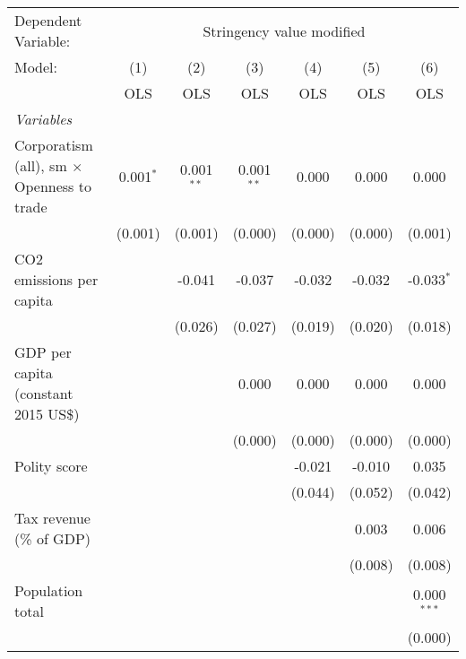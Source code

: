 
\begingroup
\centering
\begin{tabular}{lcccccc}
   \toprule
   Dependent Variable: & \multicolumn{6}{c}{Stringency value modified}\\
   Model:                                            & (1)         & (2)          & (3)          & (4)     & (5)     & (6)\\  
                                                     &  OLS        & OLS          & OLS          & OLS     & OLS     & OLS\\  
   \midrule
   \emph{Variables}\\
   Corporatism (all), sm $\times$ Openness to trade  & 0.001$^{*}$ & 0.001$^{**}$ & 0.001$^{**}$ & 0.000   & 0.000   & 0.000\\   
                                                     & (0.001)     & (0.001)      & (0.000)      & (0.000) & (0.000) & (0.001)\\   
   CO2 emissions per capita                          &             & -0.041       & -0.037       & -0.032  & -0.032  & -0.033$^{*}$\\   
                                                     &             & (0.026)      & (0.027)      & (0.019) & (0.020) & (0.018)\\   
   GDP per capita (constant 2015 US\$)               &             &              & 0.000        & 0.000   & 0.000   & 0.000\\   
                                                     &             &              & (0.000)      & (0.000) & (0.000) & (0.000)\\   
   Polity score                                      &             &              &              & -0.021  & -0.010  & 0.035\\   
                                                     &             &              &              & (0.044) & (0.052) & (0.042)\\   
   Tax revenue (\% of GDP)                           &             &              &              &         & 0.003   & 0.006\\   
                                                     &             &              &              &         & (0.008) & (0.008)\\   
   Population total                                  &             &              &              &         &         & 0.000$^{***}$\\   
                                                     &             &              &              &         &         & (0.000)\\   

\end{tabular}
